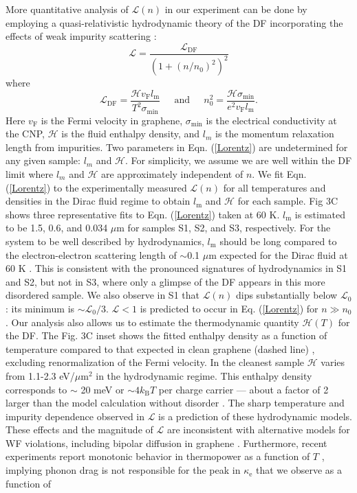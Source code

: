 \documentclass[10pt, oneside]{book}
\begin{document}
\begin{doublespace}
More quantitative analysis of $\mathcal{L}(n)$ in our experiment can be done by employing a quasi-relativistic hydrodynamic theory of the DF incorporating the effects of weak impurity scattering \cite{hkms, muller2, foster}:
\begin{equation}
\label{Lorentz}
 \mathcal{L} =  \frac{\mathcal{L}_{\mathrm{DF}}}{\left(1+(n/n_0)^2\right)^2}
 \end{equation}
 where 
\begin{equation}
\mathcal{L}_{\mathrm{DF}} = \frac{\mathcal{H}v_{\mathrm{F}}l_{\mathrm{m}}}{T^2 \sigma_{\mathrm{min}}} \;\;\;\; \textrm{~and~} \;\;\;\; n_0^2 = \frac{\mathcal{H}\sigma_{\mathrm{min}}}{e^2v_{\mathrm{F}}l_{\mathrm{m}}}.
\end{equation}
Here $v_{\mathrm{F}}$ is the Fermi velocity in graphene, $\sigma_{\mathrm{min}}$ is the electrical conductivity at the CNP, $\mathcal{H}$ is the fluid enthalpy density, and $l_m$ is the momentum relaxation length from impurities. Two parameters in Eqn. (\ref{Lorentz}) are undetermined for any given sample: $l_m$ and  $\mathcal{H}$.  For simplicity, we assume we are well within the DF limit where $l_m$ and $\mathcal{H}$ are approximately independent of $n$. We fit Eqn. (\ref{Lorentz}) to the experimentally measured $\mathcal{L}(n)$ for all temperatures and densities in the Dirac fluid regime to obtain $l_{\mathrm{m}}$ and $\mathcal{H}$  for each sample.  Fig 3C shows three representative fits to Eqn. (\ref{Lorentz}) taken at 60 K. $l_{\mathrm{m}}$ is estimated to be 1.5, 0.6, and 0.034 $\mu$m for samples S1, S2, and S3, respectively.  For the system to be well described by hydrodynamics, $l_{\mathrm{m}}$ should be long compared to the electron-electron scattering length of $\sim$0.1 $\mu$m expected for the Dirac fluid at 60 K \cite{muller2009}.  This is consistent with the pronounced signatures of hydrodynamics in S1 and S2, but not in S3, where only a glimpse of the DF appears in this more disordered sample. We also observe in S1 that $\mathcal{L}(n)$ dips substantially below $\mathcal{L}_0$:  its minimum is $\sim \mathcal{L}_0/3$.   $\mathcal{L}<1$ is predicted to occur in Eq. (\ref{Lorentz}) for $n\gg n_0$.   Our analysis also allows us to estimate the thermodynamic quantity $\mathcal{H}(T)$ for the DF. The Fig. 3C inset shows the fitted enthalpy density as a function of temperature compared to that expected in clean graphene (dashed line) \cite{muller2009}, excluding renormalization of the Fermi velocity. In the cleanest sample $\mathcal{H}$ varies from 1.1-2.3 eV/$\mu$m$^2$ in the hydrodynamic regime.   This enthalpy density corresponds to  $\sim$ 20 meV or $\sim4k_{\mathrm{B}}T$ per charge carrier --- about a factor of 2 larger than the model calculation without disorder \cite{muller2009}.    The sharp temperature and impurity dependence observed in $\mathcal{L}$ is a prediction of these hydrodynamic models.   These effects and the magnitude of $\mathcal{L}$ are inconsistent with alternative models for WF violations, including bipolar diffusion in graphene \cite{yoshino}.  Furthermore, recent experiments report monotonic behavior in thermopower as a function of $T$ \cite{ghahari}, implying phonon drag is not responsible for the peak in $\kappa_{\mathrm{e}}$ that we observe as a function of 
\end{doublespace}
\end{document}
